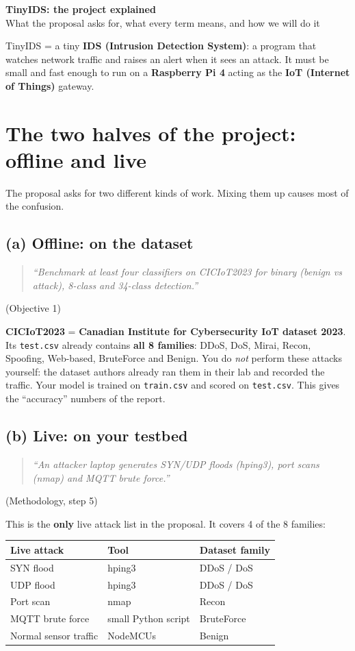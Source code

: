 \documentclass[11pt]{article}
\newcommand{\q}[1]{\begin{quote}\itshape ``#1''\end{quote}}
\begin{document}
{\LARGE\bfseries TinyIDS: the project explained}\\[4pt]
{\large What the proposal asks for, what every term means, and how we will do it}

\vspace{6pt}
TinyIDS = a tiny \textbf{IDS (Intrusion Detection System)}: a program that watches network traffic and raises an alert when it sees an attack.
It must be small and fast enough to run on a \textbf{Raspberry Pi 4} acting as the \textbf{IoT (Internet of Things)} gateway.

\tableofcontents

\newpage
\section{The two halves of the project: offline and live}

The proposal asks for two different kinds of work. Mixing them up causes most of the confusion.

\subsection*{(a) Offline: on the dataset}
\q{Benchmark at least four classifiers on CICIoT2023 for binary (benign vs attack), 8-class and 34-class detection.} (Objective 1)

\textbf{CICIoT2023} = \textbf{Canadian Institute for Cybersecurity IoT dataset 2023}.
Its \texttt{test.csv} already contains \textbf{all 8 families}: DDoS, DoS, Mirai, Recon, Spoofing, Web-based, BruteForce and Benign.
You do \emph{not} perform these attacks yourself: the dataset authors already ran them in their lab and recorded the traffic.
Your model is trained on \texttt{train.csv} and scored on \texttt{test.csv}. This gives the ``accuracy'' numbers of the report.

\subsection*{(b) Live: on your testbed}
\q{An attacker laptop generates SYN/UDP floods (hping3), port scans (nmap) and MQTT brute force.} (Methodology, step 5)

This is the \textbf{only} live attack list in the proposal. It covers 4 of the 8 families:

\begin{center}
\begin{tabular}{@{}l l l@{}}
\toprule
\textbf{Live attack} & \textbf{Tool} & \textbf{Dataset family} \\
\midrule
SYN flood & hping3 & DDoS / DoS \\
UDP flood & hping3 & DDoS / DoS \\
Port scan & nmap & Recon \\
MQTT brute force & small Python script & BruteForce \\
Normal sensor traffic & NodeMCUs & Benign \\
\bottomrule
\end{tabular}
\end{center}
\end{document}
